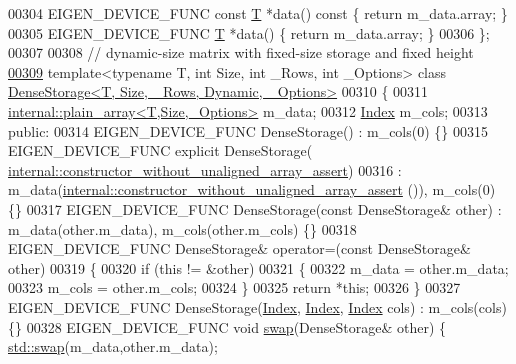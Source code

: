 \begin{DoxyCode}
00304     EIGEN\_DEVICE\_FUNC \textcolor{keyword}{const} \hyperlink{group___sparse_core___module_class_eigen_1_1_triplet}{T} *data()\textcolor{keyword}{ const }\{ \textcolor{keywordflow}{return} m\_data.array; \}
00305     EIGEN\_DEVICE\_FUNC \hyperlink{group___sparse_core___module_class_eigen_1_1_triplet}{T} *data() \{ \textcolor{keywordflow}{return} m\_data.array; \}
00306 \};
00307 
00308 \textcolor{comment}{// dynamic-size matrix with fixed-size storage and fixed height}
\hyperlink{class_eigen_1_1_dense_storage_3_01_t_00_01_size_00_01___rows_00_01_dynamic_00_01___options_01_4}{00309} \textcolor{keyword}{template}<\textcolor{keyword}{typename} T, \textcolor{keywordtype}{int} Size, \textcolor{keywordtype}{int} \_Rows, \textcolor{keywordtype}{int} \_Options> \textcolor{keyword}{class }
      \hyperlink{class_eigen_1_1_dense_storage_3_01_t_00_01_size_00_01___rows_00_01_dynamic_00_01___options_01_4}{DenseStorage<T, Size, \_Rows, Dynamic, \_Options>}
00310 \{
00311     \hyperlink{struct_eigen_1_1internal_1_1plain__array}{internal::plain\_array<T,Size,\_Options>} m\_data;
00312     \hyperlink{namespace_eigen_a62e77e0933482dafde8fe197d9a2cfde}{Index} m\_cols;
00313   \textcolor{keyword}{public}:
00314     EIGEN\_DEVICE\_FUNC DenseStorage() : m\_cols(0) \{\}
00315     EIGEN\_DEVICE\_FUNC \textcolor{keyword}{explicit} DenseStorage(
      \hyperlink{struct_eigen_1_1internal_1_1constructor__without__unaligned__array__assert}{internal::constructor\_without\_unaligned\_array\_assert})
00316       : m\_data(\hyperlink{struct_eigen_1_1internal_1_1constructor__without__unaligned__array__assert}{internal::constructor\_without\_unaligned\_array\_assert}
      ()), m\_cols(0) \{\}
00317     EIGEN\_DEVICE\_FUNC DenseStorage(\textcolor{keyword}{const} DenseStorage& other) : m\_data(other.m\_data), m\_cols(other.m\_cols) 
      \{\}
00318     EIGEN\_DEVICE\_FUNC DenseStorage& operator=(\textcolor{keyword}{const} DenseStorage& other)
00319     \{
00320       \textcolor{keywordflow}{if} (\textcolor{keyword}{this} != &other)
00321       \{
00322         m\_data = other.m\_data;
00323         m\_cols = other.m\_cols;
00324       \}
00325       \textcolor{keywordflow}{return} *\textcolor{keyword}{this};
00326     \}
00327     EIGEN\_DEVICE\_FUNC DenseStorage(\hyperlink{namespace_eigen_a62e77e0933482dafde8fe197d9a2cfde}{Index}, \hyperlink{namespace_eigen_a62e77e0933482dafde8fe197d9a2cfde}{Index}, \hyperlink{namespace_eigen_a62e77e0933482dafde8fe197d9a2cfde}{Index} cols) : m\_cols(cols) \{\}
00328     EIGEN\_DEVICE\_FUNC \textcolor{keywordtype}{void} \hyperlink{endian_8c_a3ca5ecd34b04d6a243c054ac3a57f68d}{swap}(DenseStorage& other) \{ \hyperlink{endian_8c_a3ca5ecd34b04d6a243c054ac3a57f68d}{std::swap}(m\_data,other.m\_data); 

\end{DoxyCode}
